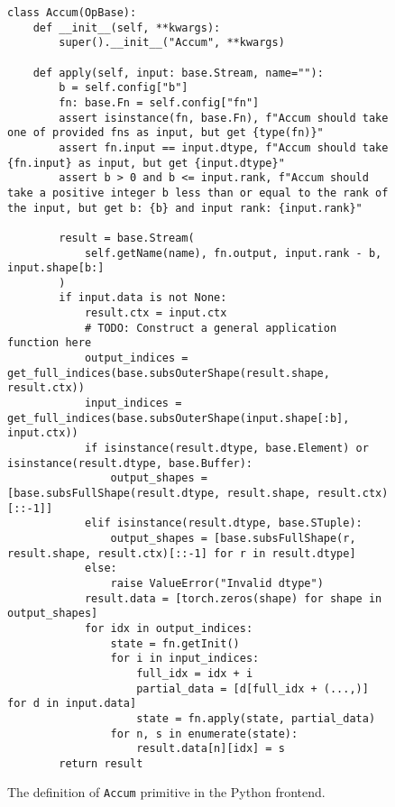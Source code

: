 \begin{figure}[htbp]
\centering
\begin{lstlisting}[language=step, mathescape=true, basicstyle=\scriptsize\ttfamily]
class Accum(OpBase):
    def __init__(self, **kwargs):
        super().__init__("Accum", **kwargs)

    def apply(self, input: base.Stream, name=""):
        b = self.config["b"]
        fn: base.Fn = self.config["fn"]
        assert isinstance(fn, base.Fn), f"Accum should take one of provided fns as input, but get {type(fn)}"
        assert fn.input == input.dtype, f"Accum should take {fn.input} as input, but get {input.dtype}"
        assert b > 0 and b <= input.rank, f"Accum should take a positive integer b less than or equal to the rank of the input, but get b: {b} and input rank: {input.rank}"

        result = base.Stream(
            self.getName(name), fn.output, input.rank - b, input.shape[b:]
        )
        if input.data is not None:
            result.ctx = input.ctx
            # TODO: Construct a general application function here
            output_indices = get_full_indices(base.subsOuterShape(result.shape, result.ctx))
            input_indices = get_full_indices(base.subsOuterShape(input.shape[:b], input.ctx))
            if isinstance(result.dtype, base.Element) or isinstance(result.dtype, base.Buffer):
                output_shapes = [base.subsFullShape(result.dtype, result.shape, result.ctx)[::-1]]
            elif isinstance(result.dtype, base.STuple):
                output_shapes = [base.subsFullShape(r, result.shape, result.ctx)[::-1] for r in result.dtype]
            else:
                raise ValueError("Invalid dtype")
            result.data = [torch.zeros(shape) for shape in output_shapes]
            for idx in output_indices:
                state = fn.getInit()
                for i in input_indices:
                    full_idx = idx + i
                    partial_data = [d[full_idx + (...,)] for d in input.data]
                    state = fn.apply(state, partial_data)
                for n, s in enumerate(state):
                    result.data[n][idx] = s
        return result
\end{lstlisting}
\caption{The definition of \texttt{Accum} primitive in the Python frontend.}
\label{fig:accum-python}
\end{figure}


